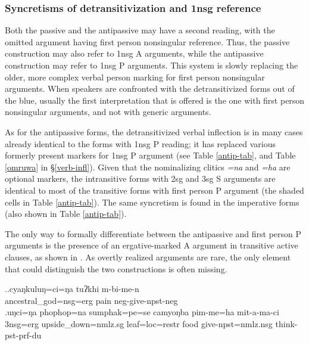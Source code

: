 \subsubsection{Syncretisms of detransitivization and {\sc 1nsg} re\-fe\-rence}\label{detrans-polite}

Both the passive and the antipassive may have a second reading, with the omitted argument having first person nonsingular reference. Thus, the passive construction may also refer to 1{\sc nsg} A arguments, while the antipassive construction may refer to 1{\sc nsg}  P arguments. This system is slowly replacing the older, more complex verbal person marking for first person nonsingular arguments. When speakers are confronted with the detransitivized forms out of the blue, usually the first interpretation that is offered is the one with first person nonsingular arguments, and not with generic arguments. 

As for the antipassive forms, the detransitivized verbal inflection is in many cases already identical to the forms with 1{\sc nsg}  P reading; it has replaced various formerly present markers for 1{\sc nsg}  P argument (see Table \ref{antip-tab}, and Table \ref{omruwa} in §\ref{verb-infl}).
Given that the nominalizing clitics \emph{=na} and \emph{=ha} are optional markers, the intransitive forms with 2sg and 3sg S arguments are identical to most of the transitive forms with first person P argument (the shaded cells in Table \ref{antip-tab}). The same syncretism is found in the imperative forms (also shown in Table \ref{antip-tab}).


The only way to formally differentiate between the antipassive and first person  P arguments is the presence of an ergative-marked A argument in transitive active clauses, as shown in \Next. As overtly realized arguments are rare, the only  element that could distinguish the two constructions is often missing.  

\ex.\ag.cyaŋkuluŋ=ci=ŋa     tuʔkhi m-bi-me-n\\
ancestral\_god{\sc =nsg=erg} pain {\sc neg-}give{\sc [3A;1.P]-npst-neg}\\
\bg.uŋci=ŋa   phophop=na  sumphak=pe=se   camyoŋba pim-me=ha mit-a-ma-ci\\
{\sc 3nsg=erg} upside\_down{\sc =nmlz.sg} leaf{\sc =loc=restr} food  give{\sc [3A;1.P]-npst=nmlz.nsg} think{\sc -pst-prf-du}\\


